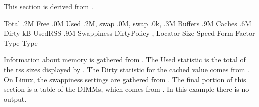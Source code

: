 \documentclass[letterpaper,10pt,english]{sphinxmanual}
\begin{document}
\sphinxAtStartPar
This section is derived from .

\begin{sphinxVerbatim}[commandchars=\\\{\}]
       Total  .2M
        Free  .0M
        Used    .2M, swap   .0M,
               swap   .0k,   .3M
     Buffers  .9M
      Caches  .6M
       Dirty   kB
     UsedRSS  .9M
  Swappiness  
 DirtyPolicy  , 
 Locator  Size  Speed    Form Factor  Type    Type 
               
\end{sphinxVerbatim}

\sphinxAtStartPar
Information about memory is gathered from . The Used statistic is the
total of the rss sizes displayed by . The Dirty statistic for the cached
value comes from . On Linux, the swappiness settings are
gathered from . The final portion of this section is a table of the
DIMMs, which comes from . In this example there is no output.
\end{document}
